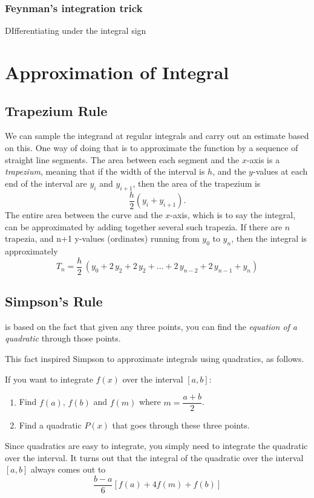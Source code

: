 \subsubsection{Feynman's integration trick}
DIfferentiating under the integral sign

\section{Approximation of Integral}
\subsection{Trapezium Rule}
We can sample the integrand at regular integrals and carry out an estimate based on this. One way of doing that is to approximate the function by a sequence of straight line segments. The area between each segment and the $x$-axis is a \emph{trapezium}, meaning that if the width of the interval is $h$, and the $y$-values at each end of the interval are $y_i$ and $y_{i+1}$, then the area of the trapezium is
\[ \frac{h}{2}(y_i+y_{i+1}). \]
The entire area between the curve and the $x$-axis, which is to say the integral, can be approximated by adding together several such trapezia. If there are $n$ trapezia, and n+1 y-values (ordinates) running from $y_0$ to $y_n$, then the integral is approximately
\begin{equation}
T_n=\frac{h}{2}\,(y_0+2\,y_2+2\,y_2+\dots+2\,y_{n-2}+2\,y_{n-1}+y_n)
\end{equation}

\subsection{Simpson's Rule}
 is based on the fact that given any three points, you can find the \emph{equation of a quadratic} through those points. 

This fact inspired Simpson to approximate integrals using quadratics, as follows.

If you want to integrate $f(x)$ over the interval $[a,b]$:
\begin{enumerate}
\item Find $f(a)$, $f(b)$ and $f(m)$ where $m=\dfrac{a+b}{2}$.
\item Find a quadratic $P(x)$ that goes through these three points.
\end{enumerate}

Since quadratics are easy to integrate, you simply need to integrate the quadratic over the interval. It turns out that the integral of the quadratic over the interval $[a,b]$ always comes out to 
\begin{equation}
\frac{b-a}{6}[f(a)+4f(m)+f(b)]
\end{equation}

